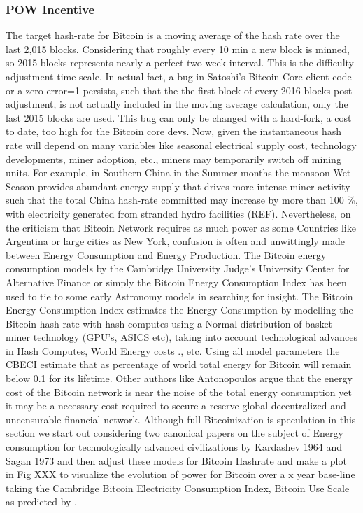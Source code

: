 \documentclass[final,5p,times,twocolumn,authoryear]{elsarticle}
\begin{document}
\subsubsection{POW Incentive}
The target hash-rate for Bitcoin is a moving average of the hash rate over the last 2,015 blocks. Considering that roughly every 10 min a new block is minned, so 2015 blocks represents nearly a perfect two week interval. This is the difficulty adjustment time-scale. In actual fact, a bug in Satoshi's Bitcoin Core client code or a zero-error=1 persists, such that the the first block of every 2016 blocks post adjustment, is not actually included in the moving average calculation, only the last 2015 blocks are used. This bug can only be changed with a hard-fork, a cost to date, too high for the Bitcoin core devs. Now, given the instantaneous hash rate will depend on many variables like seasonal electrical supply cost, technology developments, miner adoption, etc., miners may temporarily switch off mining units. For example, in Southern China in the Summer months the monsoon Wet-Season provides abundant energy supply that drives more intense miner activity such that the total China hash-rate committed may increase by more than 100 \%, with electricity generated from stranded hydro facilities (REF). Nevertheless, on the criticism that Bitcoin Network requires as much power as some Countries like Argentina or large cities as New York, confusion is often and unwittingly made between Energy Consumption and Energy Production. The Bitcoin energy consumption models by the Cambridge University Judge's University Center for Alternative Finance or simply the Bitcoin Energy Consumption Index has been used to tie to some early Astronomy models in searching for insight. The Bitcoin Energy Consumption Index estimates the Energy Consumption by modelling the Bitcoin hash rate with hash computes using a Normal distribution of basket miner technology (GPU's, ASICS etc), taking into account technological advances in Hash Computes, World Energy costs ., etc. Using all model parameters the CBECI estimate that as percentage of world total energy for Bitcoin will remain below 0.1 \percent for its lifetime. Other authors like Antonopoulos argue that the energy cost of the Bitcoin network is near the noise of the total energy consumption yet it may be a necessary cost required to secure a reserve global decentralized and uncensurable financial network. Although full Bitcoinization is speculation in this section we start out considering two canonical papers on the subject of Energy consumption for technologically advanced civilizations by Kardashev 1964 and Sagan 1973 and then adjust these models for Bitcoin Hashrate and make a plot in Fig XXX to visualize the evolution of power for Bitcoin over a x year base-line taking the Cambridge Bitcoin Electricity Consumption Index, Bitcoin Use Scale as predicted by . 
\end{document}
